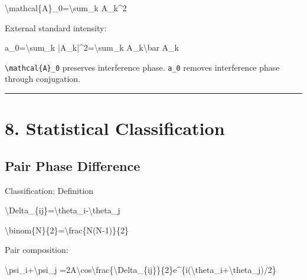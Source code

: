 \documentclass[
  a4paper]{article}
\newenvironment{Shaded}{}{}
\newcommand{\NormalTok}[1]{#1}
\begin{document}
\begin{Shaded}
\begin{Highlighting}[]
\NormalTok{\textbackslash{}mathcal\{A\}\_0=\textbackslash{}sum\_k A\_k\^{}2}
\end{Highlighting}
\end{Shaded}

External standard intensity:

\begin{Shaded}
\begin{Highlighting}[]
\NormalTok{a\_0=\textbackslash{}sum\_k |A\_k|\^{}2=\textbackslash{}sum\_k A\_k\textbackslash{}bar A\_k}
\end{Highlighting}
\end{Shaded}

\texttt{\textbackslash{}mathcal\{A\}\_0} preserves interference phase.
\texttt{a\_0} removes interference phase through conjugation.

\begin{center}\rule{0.5\linewidth}{0.5pt}\end{center}

\section{8. Statistical
Classification}\label{statistical-classification}

\subsection{Pair Phase Difference}\label{pair-phase-difference}

Classification: Definition

\begin{Shaded}
\begin{Highlighting}[]
\NormalTok{\textbackslash{}Delta\_\{ij\}=\textbackslash{}theta\_i{-}\textbackslash{}theta\_j}
\end{Highlighting}
\end{Shaded}

\begin{Shaded}
\begin{Highlighting}[]
\NormalTok{\textbackslash{}binom\{N\}\{2\}=\textbackslash{}frac\{N(N{-}1)\}\{2\}}
\end{Highlighting}
\end{Shaded}

Pair composition:

\begin{Shaded}
\begin{Highlighting}[]
\NormalTok{\textbackslash{}psi\_i+\textbackslash{}psi\_j}
\NormalTok{=2A\textbackslash{}cos\textbackslash{}frac\{\textbackslash{}Delta\_\{ij\}\}\{2\}e\^{}\{i(\textbackslash{}theta\_i+\textbackslash{}theta\_j)/2\}}
\end{Highlighting}
\end{Shaded}
\end{document}
